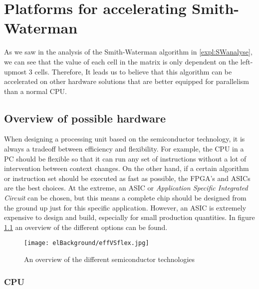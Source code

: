 
\chapter{Platforms for accelerating Smith-Waterman}
\label{ch:Platforms}

As we saw in the analysis of the Smith-Waterman algorithm in \ref{expl:SWanalyse}, we can see that the value of each cell in the matrix is only dependent on the left-upmost 3 cells. Therefore, It leads us to believe that this algorithm can be accelerated on other hardware solutions that are better equipped for parallelism than a normal CPU.

\section{Overview of possible hardware}

When designing a processing unit based on the semiconductor technology, it is always a tradeoff between efficiency and flexibility. For example, the CPU in a PC should be flexible so that it can run any set of instructions without a lot of intervention between context changes. On the other hand, if a certain algorithm or instruction set should be executed as fast as possible, the FPGA's and ASICs are the best choices. At the extreme, an ASIC or \emph{Application Specific Integrated Circuit} can be chosen, but this means a complete chip should be designed from the ground up just for this specific application. However, an ASIC is extremely expensive to design and build, especially for small production quantities. In figure \ref{fig:effVSflex} an overview of the different options can be found.

\begin{figure}[H]
	\centering
	\texttt{[image: elBackground/effVSflex.jpg]}
	\caption{An overview of the different semiconductor technologies}
	\label{fig:effVSflex}
\end{figure}

\subsection{CPU}

